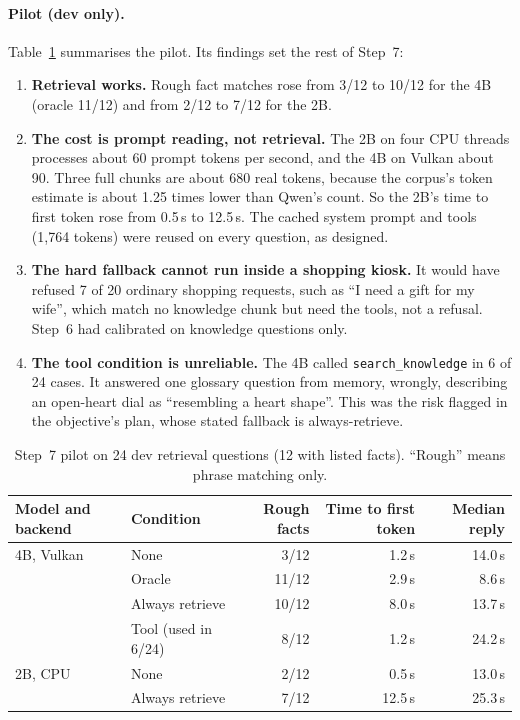 \documentclass[11pt,a4paper]{article}
\begin{document}
\paragraph{Pilot (dev only).} Table~\ref{tab:pilot} summarises the pilot. Its findings set the rest of Step~7:
\begin{enumerate}
  \item \textbf{Retrieval works.} Rough fact matches rose from 3/12 to 10/12 for the 4B (oracle 11/12) and from 2/12 to
        7/12 for the 2B.
  \item \textbf{The cost is prompt reading, not retrieval.} The 2B on four CPU threads processes about 60 prompt tokens
        per second, and the 4B on Vulkan about 90. Three full chunks are about 680 real tokens, because the corpus's
        token estimate is about 1.25 times lower than Qwen's count. So the 2B's time to first token rose from 0.5\,s to
        12.5\,s. The cached system prompt and tools (1,764 tokens) were reused on every question, as designed.
  \item \textbf{The hard fallback cannot run inside a shopping kiosk.} It would have refused 7 of 20 ordinary shopping
        requests, such as ``I need a gift for my wife'', which match no knowledge chunk but need the tools, not a
        refusal. Step~6 had calibrated on knowledge questions only.
  \item \textbf{The tool condition is unreliable.} The 4B called \texttt{search\_knowledge} in 6 of 24 cases. It
        answered one glossary question from memory, wrongly, describing an open-heart dial as ``resembling a heart
        shape''. This was the risk flagged in the objective's plan, whose stated fallback is always-retrieve.
\end{enumerate}

\begin{table}[H]
\centering
\small
\begin{tabular}{l l r r r}
\toprule
Model and backend & Condition & Rough facts & Time to first token & Median reply \\
\midrule
4B, Vulkan & None & 3/12 & 1.2\,s & 14.0\,s \\
 & Oracle & 11/12 & 2.9\,s & 8.6\,s \\
 & Always retrieve & 10/12 & 8.0\,s & 13.7\,s \\
 & Tool (used in 6/24) & 8/12 & 1.2\,s & 24.2\,s \\
2B, CPU & None & 2/12 & 0.5\,s & 13.0\,s \\
 & Always retrieve & 7/12 & 12.5\,s & 25.3\,s \\
\bottomrule
\end{tabular}
\caption{Step~7 pilot on 24 dev retrieval questions (12 with listed facts). ``Rough'' means phrase matching only.}
\label{tab:pilot}
\end{table}
\end{document}
